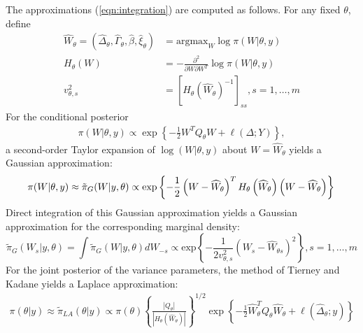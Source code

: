 \documentclass[serif,10pt]{wiley-article}
\begin{document}
The approximations (\ref{eqn:integration}) are computed as follows. For any fixed $\theta$, define
\begin{equation}\begin{aligned}\label{eqn:modeandhessian}
\widehat{W}_{\theta} = \left( \widehat{\Delta}_{\theta},\widehat{\Gamma}_{\theta},\widehat{\beta},\widehat{\xi}_{\theta}\right) &= \text{argmax}_{W}\log\pi(W|\theta,y) \\ 
H_{\theta}(W) &= -\frac{\partial^{2}}{\partial W \partial W^{T}}\log\pi(W|\theta,y) \\
v_{\theta,s}^{2} &= \left[H_\theta \left(\widehat{W}_{\theta}\right) ^ {-1} \right]_{ss}, s = 1,\ldots,m
\end{aligned}\end{equation}
For the conditional posterior
\begin{equation}\begin{aligned}\label{eqn:condpost}
\pi(W|\theta,y) \propto \exp\left\lbrace -\frac{1}{2}W^{T}Q_{\theta}W + \ell\left(\Delta;Y\right)\right\rbrace,
\end{aligned}\end{equation}
a second-order Taylor expansion of $\log(W|\theta,y)$ about $W = \widehat{W}_{\theta}$ yields a Gaussian approximation:
\begin{equation}\label{eqn:gaussianapprox}
\pi(W|\theta,y) \approx \tilde{\pi}_{G}(W|y,\theta) \propto \text{exp}\left\{-\frac{1}{2} \left(W-\widehat{W}_{\theta} \right)^T H_\theta\left(\widehat{W}_{\theta}\right) \left(W-\widehat{W}_{\theta} \right) \right\} \\
\end{equation}
Direct integration of this Gaussian approximation yields a Gaussian approximation for the corresponding marginal density:
\begin{equation}\label{eqb:marginalgaussianapprox}
\tilde{\pi}_{G}(W_{s}|y,\theta) = \int\tilde{\pi}_{G}(W|y,\theta)dW_{-s} \propto\text{exp}\left\{-\frac{1}{2v_{\theta,s}^{2}} \left(W_s-\widehat{W}_{\theta s} \right)^2 \right\}, s = 1,\ldots,m
\end{equation}
For the joint posterior of the variance parameters, the method of Tierney and Kadane \cite{tierney} yields a Laplace approximation:
\begin{equation}\begin{aligned}\label{eqn:laplace}
\pi(\theta|y) \approx \tilde{\pi}_{LA}(\theta|y) \propto \pi(\theta)\left\{\frac{\left|Q_{\theta}\right|}{\left|H_{\theta}\left(\widehat{W}_{\theta}\right)\right|}\right\}^{1/2}\exp\left\{ -\frac{1}{2}\widehat{W}_{\theta}^{T}Q_{\theta}\widehat{W}_{\theta} + \ell\left(\widehat{\Delta}_{\theta};y \right)\right\}
\end{aligned}\end{equation}
\end{document}

